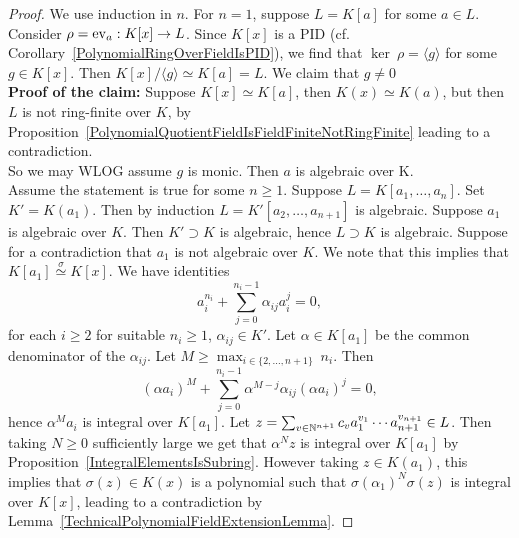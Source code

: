 \begin{proof}
    We use induction in $n$. For $n=1$, suppose $L=K[a]$ for some $a\in L$. Consider $\rho = \mathrm{ev}_a : K[x]\rightarrow L$. Since $K[x]$ is a PID (cf. Corollary~\ref{PolynomialRingOverFieldIsPID}), we find that $\ker\ \rho = \langle g \rangle$ for some $g\in K[x]$. Then $K[x]/\langle g\rangle \simeq K[a] = L$. We claim that $g\neq 0$\\
    \textbf{Proof of the claim:} Suppose $K[x]\simeq K[a]$, then $K(x) \simeq K(a)$, but then $L$ is not ring-finite over $K$, by Proposition~\ref{PolynomialQuotientFieldIsFieldFiniteNotRingFinite} leading to a contradiction.\\
    So we may WLOG assume $g$ is monic. Then $a$ is algebraic over K.\\
    Assume the statement is true for some $n\geq 1$. Suppose $L=K[a_1,\dots,a_n]$. Set $K' = K(a_1)$. Then by induction $L=K'[a_2,\dots,a_{n+1}]$ is algebraic. Suppose $a_1$ is algebraic over $K$. Then $K'\supset K$ is algebraic, hence $L\supset K$ is algebraic. Suppose for a contradiction that $a_1$ is not algebraic over $K$. We note that this implies that $K[a_1]\overset{\sigma}{\simeq} K[x]$. We have identities 
    $$a_i^{n_i}+\sum_{j=0}^{n_i-1} \alpha_{ij}a_i^{j}=0,$$
    for each $i\geq 2$ for suitable $n_i\geq 1$, $\alpha_{ij}\in K'$. Let $\alpha\in K[a_1]$ be the common denominator of the $\alpha_{ij}$. Let $M\geq \max_{i\in\{2,\dots,n+1\}}\ n_i$. Then 
    $$\left(\alpha a_i\right)^{M}+\sum_{j=0}^{n_i-1} \alpha^{M-j}\alpha_{ij} \left(\alpha a_i\right)^j=0,$$
    hence $\alpha^Ma_i$ is integral over $K[a_1]$.
    Let $z = \sum_{v\in \mathbb{N}^{n+1}} c_va_1^{v_1}\cdots a_{n+1}^{v_{n+1}}\in L$. Then taking $N\geq 0$ sufficiently large we get that $\alpha^N z$ is integral over $K[a_1]$ by Proposition~\ref{IntegralElementsIsSubring}. However taking $z\in K(a_1)$, this implies that $\sigma(z)\in K(x)$ is a polynomial such that $\sigma(\alpha_1)^N\sigma(z)$ is integral over $K[x]$, leading to a contradiction by Lemma~\ref{TechnicalPolynomialFieldExtensionLemma}.
\end{proof}

